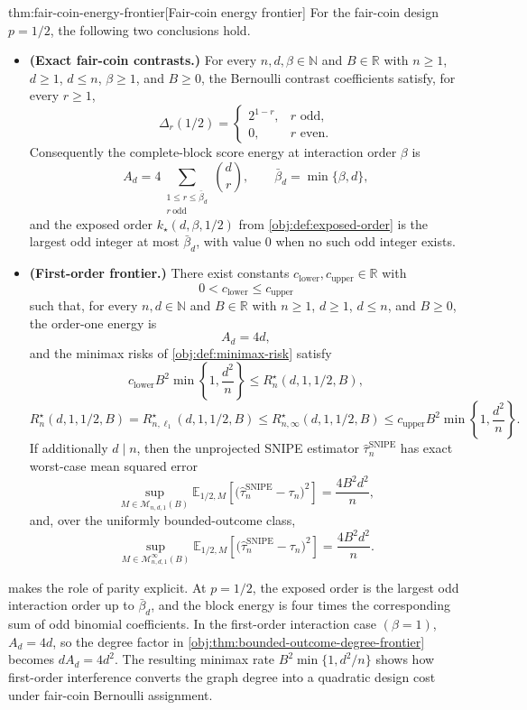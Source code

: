 \begin{theoremv}{thm:fair-coin-energy-frontier}[Fair-coin energy frontier]
For the fair-coin design \(p=1/2\), the following two conclusions hold.

\begin{itemize}
\item \textbf{(Exact fair-coin contrasts.)} For every \(n,d,\beta\in\mathbb N\) and \(B\in\mathbb R\) with \(n\ge 1\), \(d\ge 1\), \(d\le n\), \(\beta\ge 1\), and \(B\ge 0\), the Bernoulli contrast coefficients satisfy, for every \(r\ge 1\),
\[
\Delta_r(1/2)
=
\begin{cases}
2^{1-r}, & r \text{ odd},\\
0, & r \text{ even}.
\end{cases}
\]
Consequently the complete-block score energy at interaction order \(\beta\) is
\[
A_d
=
4\sum_{\substack{1\le r\le \bar\beta_d\\ r\ \mathrm{odd}}}\binom dr,
\qquad
\bar\beta_d=\min\{\beta,d\},
\]
and the exposed order \(k_\star(d,\beta,1/2)\) from \cref{obj:def:exposed-order} is the largest odd integer at most \(\bar\beta_d\), with value \(0\) when no such odd integer exists.

\item \textbf{(First-order frontier.)} There exist constants \(c_{\mathrm{lower}},c_{\mathrm{upper}}\in\mathbb R\) with
\[
0<c_{\mathrm{lower}}\le c_{\mathrm{upper}}
\]
such that, for every \(n,d\in\mathbb N\) and \(B\in\mathbb R\) with \(n\ge 1\), \(d\ge 1\), \(d\le n\), and \(B\ge 0\), the order-one energy is
\[
A_d=4d,
\]
and the minimax risks of \cref{obj:def:minimax-risk} satisfy
\[
c_{\mathrm{lower}}B^2\min\!\left\{1,\frac{d^2}{n}\right\}
\le
R_n^\star(d,1,1/2,B),
\]
\[
R_n^\star(d,1,1/2,B)
=
R_{n,\ell_1}^\star(d,1,1/2,B)
\le
R_{n,\infty}^\star(d,1,1/2,B)
\le
c_{\mathrm{upper}}B^2\min\!\left\{1,\frac{d^2}{n}\right\}.
\]
If additionally \(d\mid n\), then the unprojected SNIPE estimator \(\widehat\tau_n^{\mathrm{SNIPE}}\) has exact worst-case mean squared error
\[
\sup_{M\in\mathcal M_{n,d,1}(B)}
\mathbb E_{1/2,M}\!\left[
\bigl(\widehat\tau_n^{\mathrm{SNIPE}}-\tau_n\bigr)^2
\right]
=
\frac{4B^2d^2}{n},
\]
and, over the uniformly bounded-outcome class,
\[
\sup_{M\in\mathcal M_{n,d,1}^{\infty}(B)}
\mathbb E_{1/2,M}\!\left[
\bigl(\widehat\tau_n^{\mathrm{SNIPE}}-\tau_n\bigr)^2
\right]
=
\frac{4B^2d^2}{n}.
\]
\end{itemize}
\end{theoremv}

 makes the role of parity explicit. At \(p=1/2\), the exposed order is the largest odd interaction order up to \(\bar\beta_d\), and the block energy is four times the corresponding sum of odd binomial coefficients. In the first-order interaction case \((\beta=1)\), \(A_d=4d\), so the degree factor in \cref{obj:thm:bounded-outcome-degree-frontier} becomes \(dA_d=4d^2\). The resulting minimax rate \(B^2\min\{1,d^2/n\}\) shows how first-order interference converts the graph degree into a quadratic design cost under fair-coin Bernoulli assignment.
